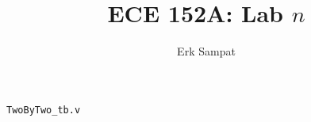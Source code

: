 \title{{\selectfont ECE 152A: } Lab $n$}
\author{Erk Sampat}



\maketitle
\labpart
\begin{step}
	\subpart
	\texttt{TwoByTwo\_tb.v}
    
\end{step}
\labpart

